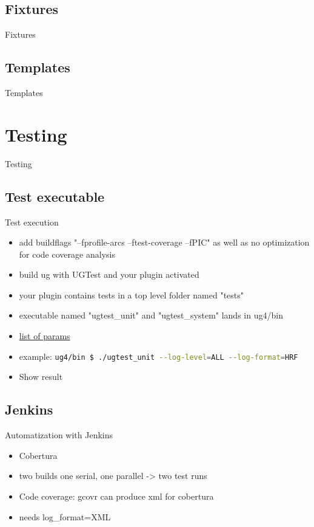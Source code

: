 \documentclass{beamer}
\newcommand{\sectiontitle}[1]{
    \section{#1}
    \begin{frame}
        \centering
        \LARGE{#1}
    \end{frame}
}
\begin{document}
        \subsection{Fixtures}
        \begin{frame}[plain]{Fixtures}
            
        \end{frame}

        \subsection{Templates}
        \begin{frame}[plain]{Templates}
            
        \end{frame}

    \sectiontitle{Testing}
        \subsection{Test executable}
        \begin{frame}{Test execution}
            \begin{itemize}
                \item add buildflags "--fprofile-arcs --ftest-coverage --fPIC" as well as no optimization for code coverage analysis
                \item build ug with UGTest and your plugin activated
                \item your plugin contains tests in a top level folder named "tests"
                \item executable named "ugtest\_unit" and "ugtest\_system" lands in ug4/bin
                \item \href{https://www.boost.org/doc/libs/1_58_0/libs/test/doc/html/utf/user-guide/runtime-config/reference.html}{list of params}
                \item example: \lstinline[language=bash]{ug4/bin $ ./ugtest_unit --log-level=ALL --log-format=HRF}
                \item Show result
            \end{itemize}
        \end{frame}
        
        \subsection{Jenkins}
        \begin{frame}{Automatization with Jenkins}
            \begin{itemize}
                \item Cobertura
                \item two builds one serial, one parallel -> two test runs
                \item Code coverage: gcovr can produce xml for cobertura
                \item needs log\_format=XML
            \end{itemize}
        \end{frame}
\end{document}
